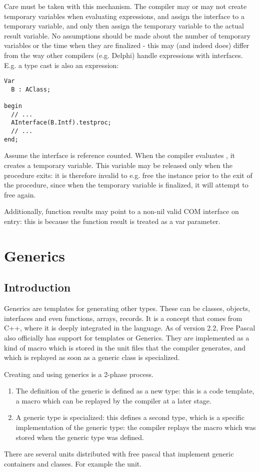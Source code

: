 Care must be taken with this mechanism. The compiler may or may not create
temporary variables when evaluating expressions, and assign the interface
to a temporary variable, and only then assign the temporary variable to 
the actual result variable. No assumptions should be made about the number
of temporary variables or the time when they are finalized - this may 
(and indeed does) differ from the way other compilers (e.g. Delphi) handle
expressions with interfaces. E.g. a type cast is also an expression:
\begin{verbatim}
Var
  B : AClass;

begin
  // ...
  AInterface(B.Intf).testproc;
  // ...
end;
\end{verbatim}
Assume the interface  is reference counted. When the compiler 
evaluates , it creates a temporary variable. This variable may be 
released only when the procedure exits: it is therefore invalid to e.g. 
free the instance  prior to the exit of the procedure, since when the 
temporary variable is finalized, it will attempt to free  again.

Additionally, function results may point to a non-nil valid COM interface on
entry: this is because the function result is treated as a var parameter.

\chapter{Generics}
\label{ch:generics}
\section{Introduction}
\label{se:genericsintroduction}
Generics are templates for generating other types. These can be classes, objects, interfaces and even functions, arrays, records. 
It is a concept that comes from C++, where it is deeply integrated in the language. 
As of version 2.2, Free Pascal also officially has support for templates or Generics. 
They are implemented as a kind of macro which is stored in the unit files that the compiler generates, 
and which is replayed as soon as a generic class is specialized.

Creating and using generics is a 2-phase process.
\begin{enumerate}
\item The definition of the generic is defined as a new type: 
this is a code template, a macro which can be replayed by the compiler 
at a later stage.
\item A generic type is specialized: this defines a second type,
which is a specific implementation of the generic type: the compiler
replays the macro which was stored when the generic type was defined.
\end{enumerate}
There are several units distributed with free pascal that implement generic
containers and classes. For example the  unit. 

